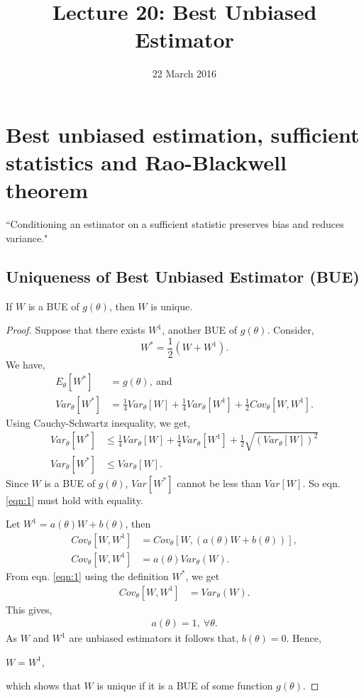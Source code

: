 \documentclass[a4paper,english,12pt]{article}
\begin{document}
\title{Lecture 20: Best Unbiased Estimator}
\date{22 March 2016}
\author{}
\maketitle
\section{Best unbiased estimation, sufficient statistics and Rao-Blackwell theorem}
``Conditioning an estimator on a sufficient statistic preserves bias and reduces variance."
\subsection{Uniqueness of Best Unbiased Estimator (BUE)}
\begin{thm} 
If $W$ is a BUE of $g(\theta)$, then $W$ is unique.
\end{thm}
\begin{proof}
Suppose that there exists $W^1$, another BUE of $g(\theta)$. Consider, 
\begin{equation}
W^*=\frac{1}{2}(W+W^1).
\end{equation}
We have,
\begin{align}
E_\theta[W^*] &= g(\theta),~\mbox{and}\\
Var_\theta[W^*] &= \frac{1}{4}Var_\theta[W]+\frac{1}{4}Var_\theta[W^1]+\frac{1}{2}Cov_\theta[W,W^1].
\end{align}
Using Cauchy-Schwartz inequality, we get,
\begin{align}
\nonumber
Var_\theta[W^*]&\leq\frac{1}{4}Var_\theta[W]+\frac{1}{4}Var_\theta[W^1]+\frac{1}{2}\sqrt{(Var_\theta[W])^2}\\ \label{eqn:1}
Var_\theta[W^*]&\leq Var_\theta[W].
\end{align}
Since $W$ is a BUE of $g(\theta)$, $Var[W^*]$ cannot be less than $Var[W]$.
So eqn. \eqref{eqn:1} must hold with equality. 
\par Let $W^1=a(\theta) W + b(\theta)$, then
\begin{align}
Cov_\theta[W,W^1]&=Cov_\theta[W,(a(\theta)W+b(\theta))],\nonumber\\
Cov_\theta[W,W^1]&=a(\theta)Var_\theta(W).
\end{align}
From eqn. \eqref{eqn:1} using the definition $W^*$, we get
\begin{align}
Cov_\theta[W,W^1]&=Var_\theta(W).
\end{align}
This gives,
\begin{align}\label{eqn:lab2}
a(\theta)=1,~\forall \theta.
\end{align}
As $W$ and $W^1$ are unbiased estimators it follows that, $b(\theta)=0$. Hence,
\begin{center}
$W=W^1$,
\end{center}
which shows that $W$ is unique if it is a BUE of some function $g(\theta)$.
\end{proof}
\end{document}
